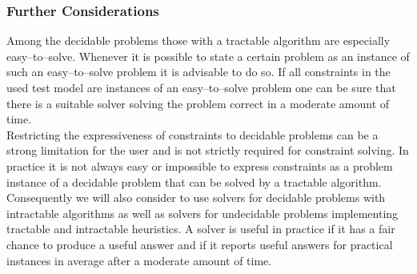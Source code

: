 \subsubsection{Further Considerations}
Among the decidable problems those with a tractable algorithm are especially easy--to--solve. Whenever it is possible to state a certain problem as an instance of such an easy--to--solve problem it is advisable to do so. If all constraints in the used test model are instances of an easy--to--solve problem one can be sure that there is a suitable solver solving the problem correct in a moderate amount of time.\\
Restricting the expressiveness of constraints to decidable problems can be a strong limitation for the user and is not strictly required for constraint solving. In practice it is not always easy or impossible to express constraints as a problem instance of a decidable problem that can be solved by a tractable algorithm. Consequently we will also consider to use solvers for decidable problems with intractable algorithms as well as solvers for undecidable problems implementing tractable and intractable heuristics. A solver is useful in practice if it has a fair chance to produce a useful answer and if it reports useful answers for practical instances in average after a moderate amount of time. 
% 
% 
% 
% 

